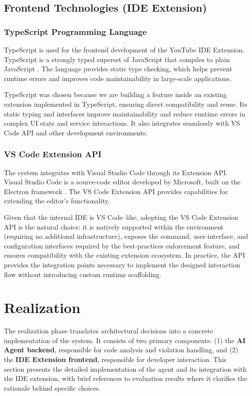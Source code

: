 \begin{spacing}{1.2}
\subsection{Frontend Technologies (IDE Extension)}

\subsubsection{TypeScript Programming Language}
TypeScript is used for the frontend development of the YouTube IDE Extension. TypeScript is a strongly typed superset of JavaScript that compiles to plain JavaScript \cite{bierman2014understanding}. The language provides static type checking, which helps prevent runtime errors and improves code maintainability in large-scale applications.

TypeScript was chosen because we are building a feature inside an existing extension implemented in TypeScript, ensuring direct compatibility and reuse. Its static typing and interfaces improve maintainability and reduce runtime errors in complex UI state and service interactions. It also integrates seamlessly with VS Code API and other development environments.


\subsubsection{VS Code Extension API}
The system integrates with Visual Studio Code through its Extension API. Visual Studio Code is a source-code editor developed by Microsoft, built on the Electron framework \cite{castor2016visual}. The VS Code Extension API provides capabilities for extending the editor's functionality.

Given that the internal IDE is VS Code–like, adopting the VS Code Extension API is the natural choice: it is natively supported within the environment (requiring no additional infrastructure), exposes the command, user‑interface, and configuration interfaces required by the best‑practices enforcement feature, and ensures compatibility with the existing extension ecosystem. In practice, the API provides the integration points necessary to implement the designed interaction flow without introducing custom runtime scaffolding.


\section{Realization}

The realization phase translates architectural decisions into a concrete implementation of the system. 
It consists of two primary components: (1) the \textbf{AI Agent backend}, responsible for code analysis 
and violation handling, and (2) the \textbf{IDE Extension frontend}, responsible for developer interaction. 
This section presents the detailed implementation of the agent and its integration with the IDE extension, with brief references to evaluation results where it clarifies the rationale behind specific choices.


\end{spacing}
